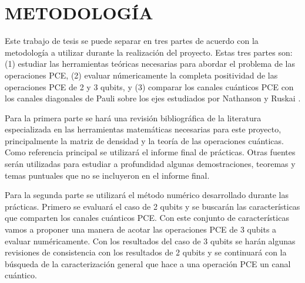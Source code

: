 \chapter{METODOLOGÍA}

Este trabajo de tesis se puede separar 
en tres partes de acuerdo con la metodología a utilizar durante
la realización del proyecto.
Estas tres partes son: (1) estudiar las herramientas 
teóricas necesarias para abordar el problema de las 
operaciones PCE, (2) evaluar númericamente
la completa positividad de las operaciones PCE de 2 y 3 qubits, y (3) 
comparar los canales cuánticos PCE con los canales diagonales de Pauli 
sobre los ejes estudiados por Nathanson y Ruskai \cite{nathanson2007pauli}.

Para la primera parte se hará una revisión bibliográfica de la literatura 
especializada en las herramientas matemáticas necesarias para este 
proyecto, principalmente la matriz de densidad y la teoría
de las operaciones cuánticas. Como referencia principal se utilizará 
el informe final de prácticas. Otras fuentes serán utilizadas 
para estudiar a profundidad algunas demostraciones,
teoremas y temas puntuales que no se incluyeron en el informe final.

Para la segunda parte se utilizará el método numérico desarrollado durante
las prácticas. Primero se evaluará el caso de 2 qubits y se buscarán las 
características que comparten los canales cuánticos PCE. 
Con este conjunto de características vamos a 
proponer una manera de acotar las operaciones PCE de 3 qubits a evaluar 
numéricamente. Con los resultados del caso de 3 qubits 
se harán algunas revisiones de consistencia con los resultados de 2 qubits 
y se continuará con la búsqueda de la caracterización general que hace 
a una operación PCE un canal cuántico.


